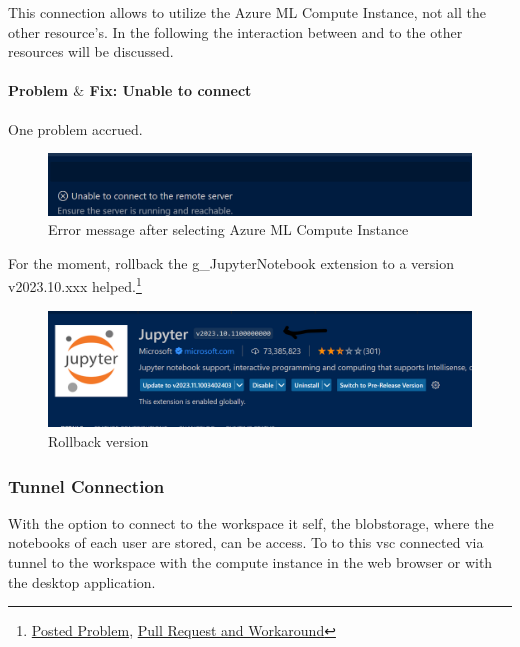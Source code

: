 This connection allows to utilize the Azure ML Compute Instance, not all the other resource's. In the following the interaction between and to the other resources will be discussed.

\paragraph{Problem $\&$ Fix: Unable to connect}
One problem accrued. 
\begin{figure}[H]
	\centering
	\includegraphics[scale = 0.3]{attachment/chapter_AML/Scc017}
	\caption{Error message after selecting Azure ML Compute Instance}
\end{figure}

For the moment, rollback the \gls{g_JupyterNotebook} extension to a version v2023.10.xxx helped.\footnote{
	\href{https://github.com/microsoft/vscode-jupyter/issues/14925}{Posted Problem}, \href{https://github.com/microsoft/vscode-jupyter/pull/14929}{Pull Request and Workaround}
}
\begin{figure}[H]
	\centering
	\includegraphics[scale = 0.3]{attachment/chapter_AML/Scc018}
	\caption{Rollback version}
\end{figure}

\subsubsection{Tunnel Connection}

With the option to connect to the workspace it self, the blobstorage, where the notebooks of each user are stored, can be access. To to this \gls{vsc} connected via tunnel to the workspace with the compute instance in the web browser or with the desktop application.
 
